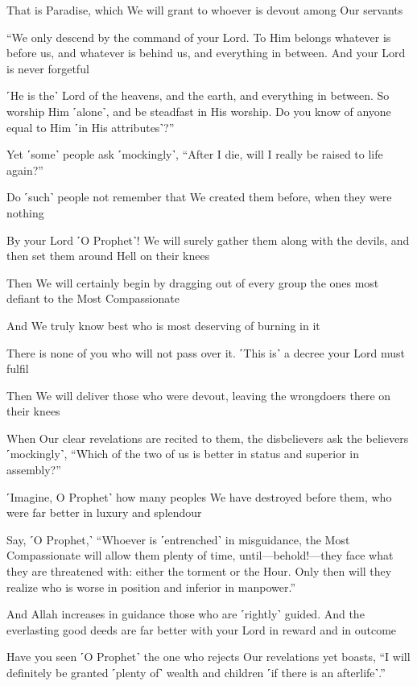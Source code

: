 That is Paradise, which We will grant to whoever is devout among Our servants

“We only descend by the command of your Lord. To Him belongs whatever is before us, and whatever is behind us, and everything in between. And your Lord is never forgetful

˹He is the˺ Lord of the heavens, and the earth, and everything in between. So worship Him ˹alone˺, and be steadfast in His worship. Do you know of anyone equal to Him ˹in His attributes˺?”

Yet ˹some˺ people ask ˹mockingly˺, “After I die, will I really be raised to life again?”

Do ˹such˺ people not remember that We created them before, when they were nothing

By your Lord ˹O Prophet˺! We will surely gather them along with the devils, and then set them around Hell on their knees

Then We will certainly begin by dragging out of every group the ones most defiant to the Most Compassionate

And We truly know best who is most deserving of burning in it

There is none of you who will not pass over it. ˹This is˺ a decree your Lord must fulfil

Then We will deliver those who were devout, leaving the wrongdoers there on their knees

When Our clear revelations are recited to them, the disbelievers ask the believers ˹mockingly˺, “Which of the two of us is better in status and superior in assembly?”

˹Imagine, O Prophet˺ how many peoples We have destroyed before them, who were far better in luxury and splendour

Say, ˹O Prophet,˺ “Whoever is ˹entrenched˺ in misguidance, the Most Compassionate will allow them plenty of time, until—behold!—they face what they are threatened with: either the torment or the Hour. Only then will they realize who is worse in position and inferior in manpower.”

And Allah increases in guidance those who are ˹rightly˺ guided. And the everlasting good deeds are far better with your Lord in reward and in outcome

Have you seen ˹O Prophet˺ the one who rejects Our revelations yet boasts, “I will definitely be granted ˹plenty of˺ wealth and children ˹if there is an afterlife˺.”

